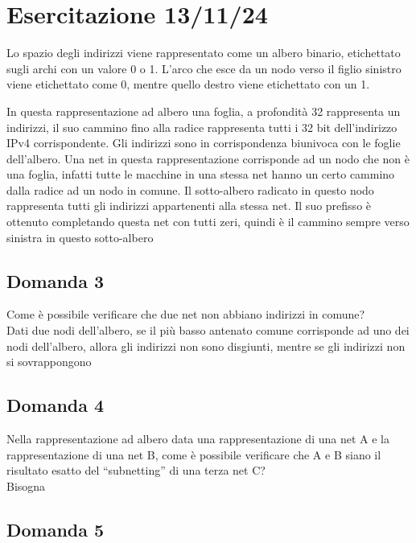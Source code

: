 \documentclass{article}
\numberwithin{equation}{subsection}
\begin{document}
\clearpage

\section{Esercitazione 13/11/24}

Lo spazio degli indirizzi viene rappresentato come un albero binario, etichettato sugli archi con un valore 0 o 1. L'arco che esce da un nodo verso 
il figlio sinistro viene etichettato come 0, mentre quello destro viene etichettato con un 1. 

In questa rappresentazione ad albero una foglia, a profondità 32 rappresenta un indirizzi, il suo cammino fino alla radice rappresenta tutti i 32 bit dell'indirizzo 
IPv4 corrispondente. 
Gli indirizzi sono in corrispondenza biunivoca con le foglie dell'albero. Una net in questa rappresentazione corrisponde ad un nodo che non è una foglia, 
infatti tutte le macchine in una stessa net hanno un certo cammino dalla radice ad un nodo in comune. Il sotto-albero radicato in questo nodo rappresenta tutti gli 
indirizzi appartenenti alla stessa net. 
Il suo prefisso è ottenuto completando questa net con tutti zeri, quindi è il cammino sempre verso sinistra in questo sotto-albero


\subsection{Domanda 3}

Come è possibile verificare che due net non abbiano indirizzi in comune?\\
Dati due nodi dell'albero, se il più basso antenato comune corrisponde ad uno dei nodi dell'albero, allora gli indirizzi non sono disgiunti, 
mentre se gli indirizzi non si sovrappongono %

\subsection*{Domanda 4}

Nella rappresentazione ad albero data una rappresentazione di una net A e la rappresentazione di una net B, come è possibile verificare che A e B siano il risultato 
esatto del ``subnetting'' di una terza net C?\\
Bisogna 

\subsection*{Domanda 5}
\end{document}
